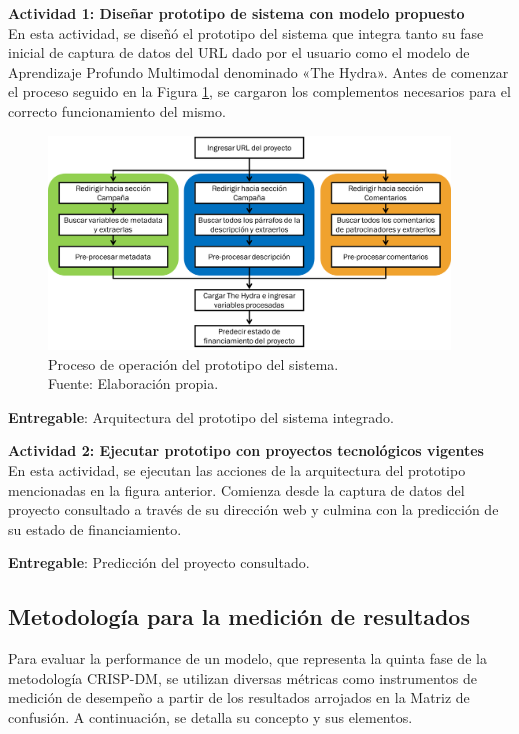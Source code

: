 \textbf{Actividad 1: Diseñar prototipo de sistema con modelo propuesto}
\\
En esta actividad, se diseñó el prototipo del sistema que integra tanto su fase inicial de captura de datos del URL dado por el usuario como el modelo de Aprendizaje Profundo Multimodal denominado «The Hydra». Antes de comenzar el proceso seguido en la Figura \ref{3:fig10}, se cargaron los complementos necesarios para el correcto funcionamiento del mismo.

\begin{figure}[h]
	\begin{center}
		\includegraphics[width=0.95\textwidth]{5/figures/demo_flux.png}
		\caption[Proceso de operación del prototipo del sistema]{Proceso de operación del prototipo del sistema.\\
			Fuente: Elaboración propia.}
		\label{3:fig10}
	\end{center}
\end{figure}

\textbf{Entregable}: Arquitectura del prototipo del sistema integrado.

\textbf{Actividad 2: Ejecutar prototipo con proyectos tecnológicos vigentes}
\\
En esta actividad, se ejecutan las acciones de la arquitectura del prototipo mencionadas en la figura anterior. Comienza desde la captura de datos del proyecto consultado a través de su dirección web y culmina con la predicción de su estado de financiamiento.

\textbf{Entregable}: Predicción del proyecto consultado.

\subsection{Metodología para la medición de resultados}
Para evaluar la performance de un modelo, que representa la quinta fase de la metodología CRISP-DM, se utilizan diversas métricas como instrumentos de medición de desempeño a partir de los resultados arrojados en la Matriz de confusión. A continuación, se detalla su concepto y sus elementos.

